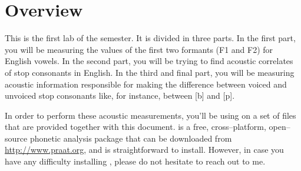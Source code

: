 \section{Overview}

This is the first lab of the semester. It is divided in three parts. In the first part, you will be measuring the values of the first two formants (F1 and F2) for English vowels. In the second part, you will be trying to find acoustic correlates of stop consonants in English. In the third and final part, you will be measuring acoustic information responsible for making the difference between voiced and unvoiced stop consonants like, for instance, between [b] and [p].

In order to perform these acoustic measurements, you'll be using \Praat{} on a set of files that are provided together with this document. \Praat{} is a free, cross--platform, open--source phonetic analysis package that can be downloaded from \href{http://www.praat.org}{http://www.praat.org}, and is straightforward to install. However, in case you have any difficulty installing \Praat{}, please do not hesitate to reach out to me.

